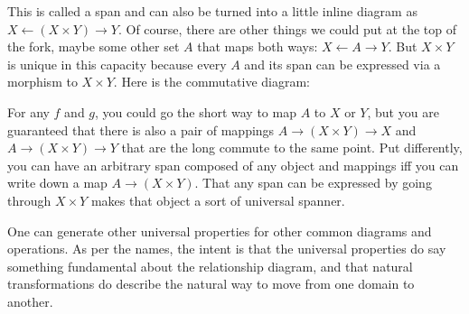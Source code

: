 \documentclass[11pt]{article}
\begin{document}

This is called a span and can also be turned into a little inline diagram as
$X \leftarrow (X\times Y) \rightarrow Y$.
Of course, there are other things we could put at the top of the fork, maybe some other
set $A$ that maps both ways: $X \leftarrow A \rightarrow Y$.
But $X\times Y$ is unique in this capacity because every $A$ and its span can be expressed
via a morphism to $X\times Y$. Here is the commutative diagram:


For any $f$ and $g$, you could go the short way to map $A$ to $X$ or $Y$, but you are
guaranteed that there is also a pair of mappings $A\to (X\times Y) \to X$ and $A\to
(X\times Y) \to Y$ that are
the long commute to the same point.  Put differently, you can have an arbitrary
span composed of any object and mappings iff you can write down a map $A\to (X\times
Y)$. That any span can be expressed by going through $X\times Y$ makes that object a
sort of universal spanner.

One can generate other universal properties for other common diagrams and operations.
As per the names, the intent is that the universal properties do say something fundamental
about the relationship diagram, and that natural transformations do describe the
natural way to move from one domain to another.

\nocite{awodey:category}
\nocite{riehl:category}


\end{document}
